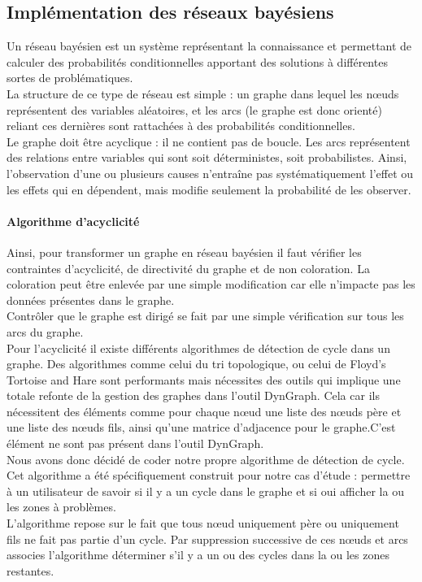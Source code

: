 \documentclass[conference]{IEEEtran}
\begin{document}
\subsection{Implémentation des réseaux bayésiens}

Un réseau bayésien est un système représentant la connaissance et permettant de calculer des
probabilités conditionnelles apportant des solutions à différentes sortes de problématiques. \\
La structure de ce type de réseau est simple : un graphe dans lequel les nœuds représentent des
variables aléatoires, et les arcs (le graphe est donc orienté) reliant ces dernières sont rattachées à des
probabilités conditionnelles. \\
Le graphe doit être acyclique : il ne contient pas de boucle. Les arcs représentent des relations
entre variables qui sont soit déterministes, soit probabilistes.
Ainsi, l'observation d'une ou plusieurs causes n'entraîne pas systématiquement l'effet ou les effets qui
en dépendent, mais modifie seulement la probabilité de les observer. \\
\paragraph{Algorithme d'acyclicité \\}
Ainsi, pour transformer un graphe en réseau bayésien il faut vérifier les contraintes d'acyclicité, de directivité du graphe et de non coloration. La coloration peut être enlevée par une simple modification car elle n'impacte pas les données présentes dans le graphe. \\
Contrôler que le graphe est dirigé se fait par une simple vérification sur tous les arcs du graphe.\\
Pour l'acyclicité il existe différents algorithmes de détection de cycle dans un graphe. Des algorithmes comme celui du tri topologique, ou celui de Floyd's Tortoise and Hare sont performants mais nécessites des outils qui implique une totale refonte de la gestion des graphes dans l'outil DynGraph. Cela car ils nécessitent des éléments comme pour chaque nœud une liste des nœuds père et une liste des nœuds fils, ainsi qu'une matrice d'adjacence pour le graphe.C'est élément ne sont pas présent dans l'outil DynGraph.\\
Nous avons donc décidé de coder notre propre algorithme de détection de cycle. Cet algorithme a été spécifiquement construit pour notre cas d'étude : permettre à un utilisateur de savoir si il y a un cycle dans le graphe et si oui afficher la ou les zones à problèmes. \\
L'algorithme repose sur le fait que tous nœud uniquement père ou uniquement fils ne fait pas partie d'un cycle. Par suppression successive de ces nœuds et arcs associes l'algorithme déterminer s'il y a un ou des cycles dans la ou les zones restantes.  \\
\end{document}
